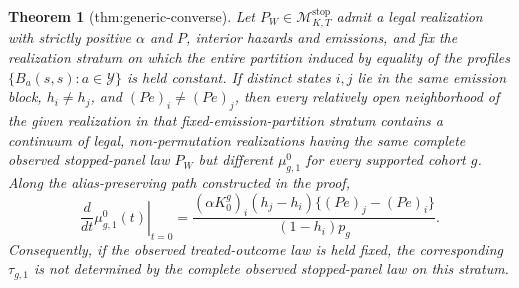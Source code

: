 \documentclass{article}
\newtheorem{theorem}{Theorem}
\begin{document}
\begin{theorem}[thm:generic-converse]\label{thm:generic-converse}
Let \(P_W\in\mathcal M^{\mathrm{stop}}_{K,T}\) admit a legal realization with strictly positive \(\alpha\) and \(P\), interior hazards and emissions, and fix the realization stratum on which the entire partition induced by equality of the profiles \(\{B_a(s,s):a\in\mathcal Y\}\) is held constant. If distinct states \(i,j\) lie in the same emission block, \(h_i\ne h_j\), and \((Pe)_i\ne(Pe)_j\), then every relatively open neighborhood of the given realization in that fixed-emission-partition stratum contains a continuum of legal, non-permutation realizations having the same complete observed stopped-panel law \(P_W\) but different \(\mu^0_{g,1}\) for every supported cohort \(g\). Along the alias-preserving path constructed in the proof,
\[
 \left.\frac{d}{dt}\mu^0_{g,1}(t)\right|_{t=0}
 =\frac{(\alpha K_0^g)_i(h_j-h_i)\{(Pe)_j-(Pe)_i\}}{(1-h_i)p_g}.
\]
Consequently, if the observed treated-outcome law is held fixed, the corresponding \(\tau_{g,1}\) is not determined by the complete observed stopped-panel law on this stratum.
\end{theorem}
\end{document}
